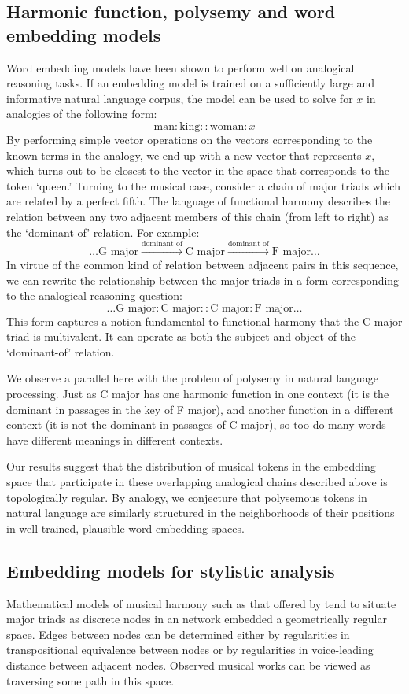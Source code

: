 \subsection{Harmonic function, polysemy and word embedding models}
Word embedding models have been shown to perform well on analogical reasoning tasks. If an embedding model is trained on a sufficiently large and informative natural language corpus, the model can be used to solve for $x$ in analogies of the following form:
$$\textrm{man}:\textrm{king}::\textrm{woman}:x$$
By performing simple vector operations on the vectors corresponding to the known terms in the analogy, we end up with a new vector that represents $x$, which turns out to be closest to the vector in the space that corresponds to the token `$\textrm{queen}$.' 
Turning to the musical case, consider a chain of major triads which are related by a perfect fifth. The language of functional harmony describes the relation between any two adjacent members of this chain (from left to right) as the `dominant-of' relation. For example:
$$\hdots \textrm{G major} \xrightarrow{\textrm{dominant of}} \textrm{C major} \xrightarrow{\textrm{dominant of}} \textrm{F major} \hdots$$
In virtue of the common kind of relation between adjacent pairs in this sequence, we can rewrite the relationship between the major triads in a form corresponding to the analogical reasoning question:
$$\hdots \textrm{G major} : \textrm{C major}  :: \textrm{C major} : \textrm{F major} \hdots$$
This form captures a notion fundamental to functional harmony that the C major triad is multivalent. It can operate as both the subject and object of the `dominant-of' relation. 

We observe a parallel here with the problem of polysemy in natural language processing. Just as C major has one harmonic function in one context (it is the dominant in passages in the key of F major), and another function in a different context (it is not the dominant in passages of C major), so too do many words have different meanings in different contexts.

Our results suggest that the distribution of musical tokens in the embedding space that participate in these overlapping analogical chains described above is topologically regular. By analogy, we conjecture that polysemous tokens in natural language are similarly structured in the neighborhoods of their positions in well-trained, plausible word embedding spaces.

\subsection{Embedding models for stylistic analysis}
Mathematical models of musical harmony such as that offered by \cite{Callender2008} tend to situate major triads as discrete nodes in an network embedded a geometrically regular space. Edges between nodes can be determined either by regularities in transpositional equivalence between nodes or by regularities in voice-leading distance between adjacent nodes. Observed musical works can be viewed as traversing some path in this space. 

